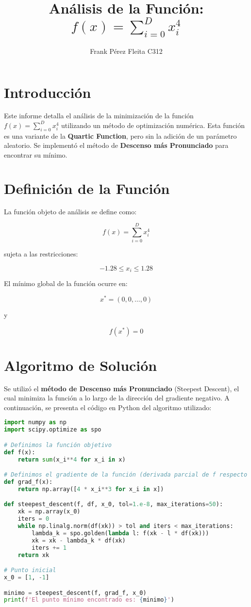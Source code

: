 \documentclass{article}
\title{Análisis de la Función: $ f(x) = \sum_{i=0}^{D} x_i^4 $}
\author{Frank Pérez Fleita C312}
\begin{document}
\maketitle

\section{Introducción}

Este informe detalla el análisis de la minimización de la función $ f(x) = \sum_{i=0}^{D} x_i^4 $ utilizando un método de optimización numérica. Esta función es una variante de la \textbf{Quartic Function}, pero sin la adición de un parámetro aleatorio. Se implementó el método de \textbf{Descenso más Pronunciado} para encontrar su mínimo.

\section{Definición de la Función}

La función objeto de análisis se define como:

\[
f(x) = \sum_{i=0}^{D} x_i^4
\]

sujeta a las restricciones:

\[
-1.28 \leq x_i \leq 1.28
\]

El mínimo global de la función ocurre en:

\[
x^* = (0, 0, \dots, 0)
\]

y

\[
f(x^*) = 0
\]

\section{Algoritmo de Solución}

Se utilizó el \textbf{método de Descenso más Pronunciado} (Steepest Descent), el cual minimiza la función a lo largo de la dirección del gradiente negativo. A continuación, se presenta el código en Python del algoritmo utilizado:

\begin{lstlisting}[language=Python]
import numpy as np
import scipy.optimize as spo

# Definimos la función objetivo
def f(x):
    return sum(x_i**4 for x_i in x)

# Definimos el gradiente de la función (derivada parcial de f respecto a cada x_i)
def grad_f(x):
    return np.array([4 * x_i**3 for x_i in x])

def steepest_descent(f, df, x_0, tol=1.e-8, max_iterations=50):
    xk = np.array(x_0)
    iters = 0
    while np.linalg.norm(df(xk)) > tol and iters < max_iterations:
        lambda_k = spo.golden(lambda l: f(xk - l * df(xk)))
        xk = xk - lambda_k * df(xk)
        iters += 1
    return xk

# Punto inicial
x_0 = [1, -1]

minimo = steepest_descent(f, grad_f, x_0)
print(f'El punto mínimo encontrado es: {minimo}')
\end{lstlisting}
\end{document}
